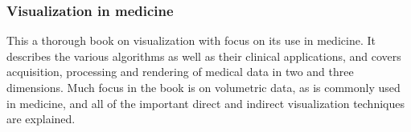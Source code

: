 
\subsubsection{Visualization in medicine \cite{preim2007}}
	
	This a thorough book on visualization with focus on its use in medicine. It describes the various algorithms as well as their clinical applications, and covers acquisition, processing and rendering of medical data in two and three dimensions. Much focus in the book is on volumetric data, as is commonly used in medicine, and all of the important direct and indirect visualization techniques are explained.
		
